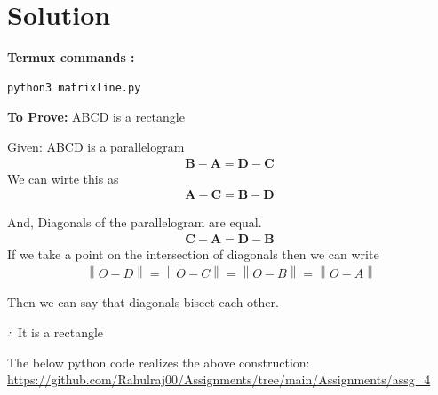 \documentclass[10pt, a4paper]{article}
\providecommand{\norm}[1]{\left\lVert#1\right\rVert}
\let\vec\mathbf
\begin{document}
   \section{Solution}

\vspace{1mm}
\textbf{Termux commands :}
\begin{lstlisting}
python3 matrixline.py
\end{lstlisting}


\vspace{.25 cm}
\textbf{To Prove:}
ABCD is a rectangle

 Given:
 ABCD is a parallelogram
\begin{align}
 \vec{B} - \vec{A}= \vec{D}-\vec{C}\
	\end{align}
	We can wirte this as
\begin{align}
 \vec{A} - \vec{C}= \vec{B}-\vec{D}\
	\end{align}
		
	And, Diagonals of the parallelogram are equal.
\begin{align}
 \vec{C} - \vec{A}= \vec{D}-\vec{B}\
	\end{align}
	If we take a point on the intersection of diagonals then we can write
\begin{align}
 \norm{O-D} = \norm{O-C} = \norm{O-B} = \norm{O-A}
	\end{align}
		
Then we can say that diagonals bisect each other.


$\therefore$ It is a rectangle

\vspace{1mm}
The below python code realizes the above construction:	
\url{https://github.com/Rahulraj00/Assignments/tree/main/Assignments/assg_4}

\end{document}
